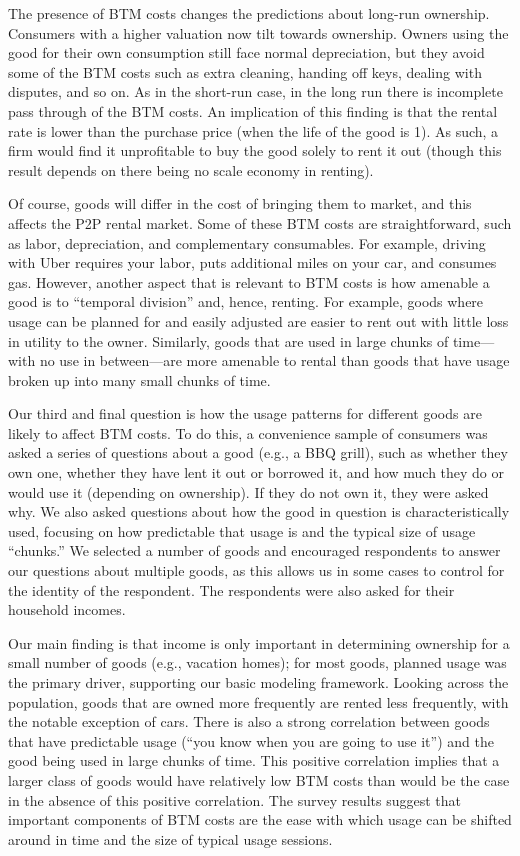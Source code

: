 \documentclass[11pt]{article}
\begin{document}
The presence of BTM costs changes the predictions about long-run ownership.
Consumers with a higher valuation now tilt towards ownership.
Owners using the good for their own consumption still face normal depreciation, but they avoid some of the BTM costs such as extra cleaning, handing off keys, dealing with disputes, and so on. 
As in the short-run case, in the long run there is incomplete pass through of the BTM costs.
An implication of this finding is that the rental rate is lower than the purchase price (when the life of the good is 1).
As such, a firm would find it unprofitable to buy the good solely to rent it out (though this result depends on there being no scale economy in renting). 

Of course, goods will differ in the cost of bringing them to market, and this affects the P2P rental market. 
Some of these BTM costs are straightforward, such as labor, depreciation, and complementary consumables.
For example, driving with Uber requires your labor, puts additional miles on your car, and consumes gas.
However, another aspect that is relevant to BTM costs is how amenable a good is to ``temporal division'' and, hence, renting.
For example, goods where usage can be planned for and easily adjusted are easier to rent out with little loss in utility to the owner. 
Similarly, goods that are used in large chunks of time---with no use in between---are more amenable to rental than goods that have usage broken up into many small chunks of time.

Our third and final question is how the usage patterns for different goods are likely to affect BTM costs.
To do this, a convenience sample of consumers was asked a series of questions about a good (e.g., a BBQ grill), such as whether they own one, whether they have lent it out or borrowed it, and how much they do or would use it (depending on ownership). 
If they do not own it, they were asked why. 
We also asked questions about how the good in question is characteristically used, focusing on how predictable that usage is and the typical size of usage ``chunks.''  
We selected a number of goods and encouraged respondents to answer our questions about multiple goods, as this allows us in some cases to control for the identity of the respondent. 
The respondents were also asked for their household incomes.

Our main finding is that income is only important in determining ownership for a small number of goods (e.g., vacation homes); 
for most goods, planned usage was the primary driver, supporting our basic modeling framework.  
Looking across the population, goods that are owned more frequently are rented less frequently, with the notable exception of cars.
There is also a strong correlation between goods that have predictable usage (``you know when you are going to use it'') and the good being used in large chunks of time.
This positive correlation implies that a larger class of goods would have relatively low BTM costs than would be the case in the absence of this positive correlation. 
The survey results suggest that important components of BTM costs are the ease with which usage can be shifted around in time and the size of typical usage sessions.
\end{document}
